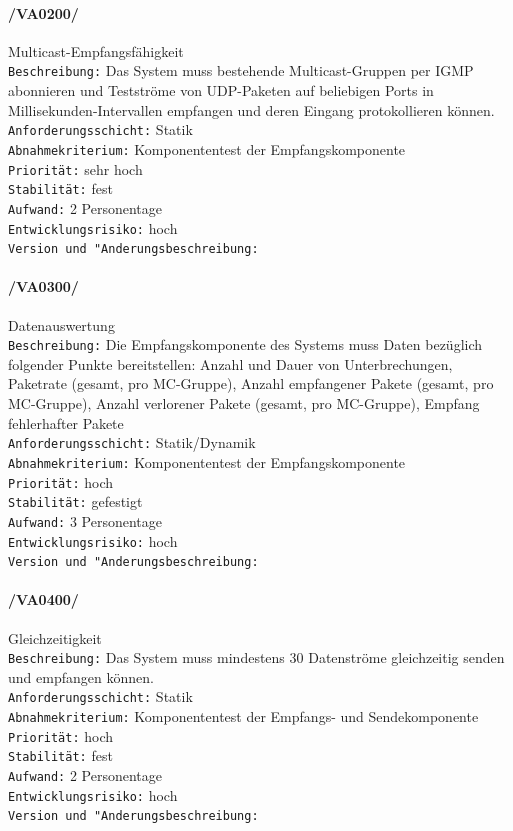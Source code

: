 \paragraph{/VA0200/} Multicast-Empfangsfähigkeit\\
\texttt{Beschreibung:} Das System muss bestehende Multicast-Gruppen
per IGMP abonnieren und Testströme von UDP-Paketen auf beliebigen Ports in
Millisekunden-Intervallen empfangen und deren Eingang protokollieren können.\\
\texttt{Anforderungsschicht:} Statik\\
\texttt{Abnahmekriterium:} Komponententest
der Empfangskomponente\\
\texttt{Priorität:} sehr hoch\\
\texttt{Stabilität:} fest\\
\texttt{Aufwand:} 2 Personentage\\
\texttt{Entwicklungsrisiko:} hoch\\
\texttt{Version und "Anderungsbeschreibung:}

\paragraph{/VA0300/} Datenauswertung\\
\texttt{Beschreibung:} Die Empfangskomponente des Systems muss Daten bezüglich
folgender Punkte bereitstellen: Anzahl und Dauer von Unterbrechungen, Paketrate
(gesamt, pro MC-Gruppe), Anzahl empfangener Pakete (gesamt, pro MC-Gruppe),
Anzahl verlorener Pakete (gesamt, pro MC-Gruppe), Empfang fehlerhafter Pakete\\
\texttt{Anforderungsschicht:} Statik/Dynamik\\
\texttt{Abnahmekriterium:} Komponententest der Empfangskomponente\\
\texttt{Priorität:} hoch\\
\texttt{Stabilität:} gefestigt\\
\texttt{Aufwand:} 3 Personentage\\
\texttt{Entwicklungsrisiko:} hoch\\
\texttt{Version und "Anderungsbeschreibung:}

\paragraph{/VA0400/} Gleichzeitigkeit\\
\texttt{Beschreibung:} Das System muss mindestens 30 Datenströme gleichzeitig
senden und empfangen können.\\
\texttt{Anforderungsschicht:} Statik\\
\texttt{Abnahmekriterium:} Komponententest der Empfangs- und Sendekomponente\\
\texttt{Priorität:} hoch\\
\texttt{Stabilität:} fest\\
\texttt{Aufwand:} 2 Personentage\\
\texttt{Entwicklungsrisiko:} hoch\\
\texttt{Version und "Anderungsbeschreibung:}

